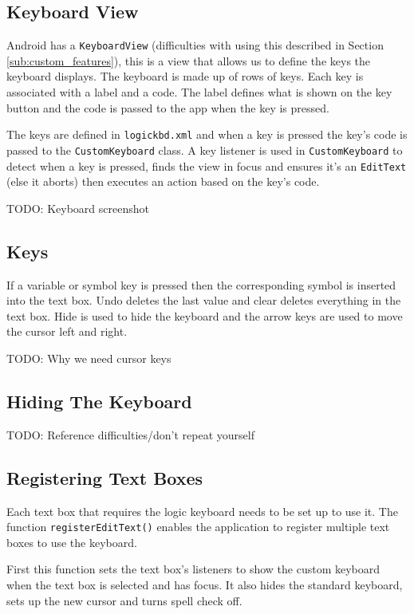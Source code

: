 \documentclass{report}
\begin{document}
\subsection{Keyboard View}

Android has a {\tt KeyboardView} (difficulties with using this described in Section \ref{sub:custom_features}), this is a view that allows us to define the keys the keyboard displays. The keyboard is made up of rows of keys. Each key is associated with a label and a code. The label defines what is shown on the key button and the code is passed to the app when the key is pressed. 

The keys are defined in {\tt logickbd.xml} and when a key is pressed the key's code is passed to the {\tt CustomKeyboard} class. A key listener is used in {\tt CustomKeyboard} to detect when a key is pressed, finds the view in focus and ensures it's an {\tt EditText} (else it aborts) then executes an action based on the key's code.

TODO: Keyboard screenshot  

\subsection{Keys}

If a variable or symbol key is pressed then the corresponding symbol is inserted into the text box. Undo deletes the last value and clear deletes everything in the text box. Hide is used to hide the keyboard and the arrow keys are used to move the cursor left and right.

TODO: Why we need cursor keys 

\subsection{Hiding The Keyboard}
\label{sub:hiding_the_keyboard}

TODO: Reference difficulties/don't repeat yourself

\subsection{Registering Text Boxes}

Each text box that requires the logic keyboard needs to be set up to use it. The function {\tt registerEditText()} enables the application to register multiple text boxes to use the keyboard.

First this function sets the text box's listeners to show the custom keyboard when the text box is selected and has focus. It also hides the standard keyboard, sets up the new cursor and turns spell check off.
\end{document}
